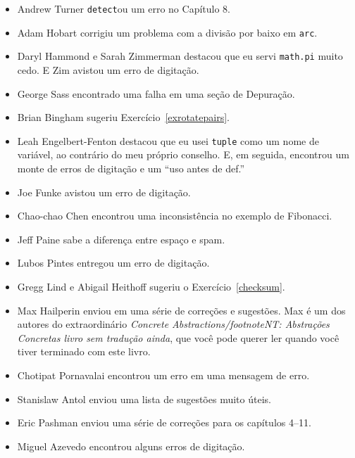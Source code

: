 \documentclass[10pt]{book}
\begin{document}
\begin {itemize}
\item Andrew Turner {\tt detect}ou um erro no Capítulo 8.

\item Adam Hobart corrigiu um problema com a divisão por baixo em {\tt arc}. %

\item Daryl Hammond e Sarah Zimmerman destacou que eu servi
 {\tt math.pi} muito cedo. E Zim avistou um erro de digitação. %

\item George Sass encontrado uma falha em uma seção de Depuração.

\item Brian Bingham sugeriu Exercício~\ref{exrotatepairs}.

\item Leah Engelbert-Fenton destacou que eu usei {\tt tuple}
como um nome de variável, ao contrário do meu próprio conselho. E, em seguida, encontrou
um monte de erros de digitação e um ``uso antes de def.''

\item Joe Funke avistou um erro de digitação.

\item Chao-chao Chen encontrou uma inconsistência no exemplo de Fibonacci.

\item Jeff Paine sabe a diferença entre espaço e spam.

\item Lubos Pintes entregou um erro de digitação.

\item Gregg Lind e Abigail Heithoff sugeriu o Exercício~\ref{checksum}.

\item Max Hailperin enviou em uma série de correções e
  sugestões. Max é um dos autores do extraordinário {\em
    Concrete Abstractions/footnote{NT: Abstrações Concretas livro sem tradução ainda}}, que você pode querer ler quando você tiver
  terminado com este livro.

\item Chotipat Pornavalai encontrou um erro em uma mensagem de erro.

\item Stanislaw Antol enviou uma lista de sugestões muito úteis.

\item Eric Pashman enviou uma série de correções para os capítulos 4--11.

\item Miguel Azevedo encontrou alguns erros de digitação.


\end{itemize}
\end{document}
